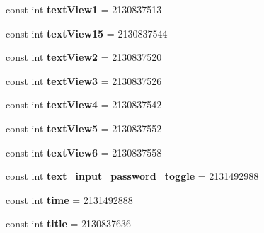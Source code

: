 \begin{DoxyCompactItemize}
const int {\bfseries text\+View1} = 2130837513
\item 
\mbox{\label{classst_delivery_1_1_resource_1_1_id_aae94328cea67c0ba1462637fed0d65a0}} 
const int {\bfseries text\+View15} = 2130837544
\item 
\mbox{\label{classst_delivery_1_1_resource_1_1_id_af31da1de1242db1f03e7ebe3fdaa626b}} 
const int {\bfseries text\+View2} = 2130837520
\item 
\mbox{\label{classst_delivery_1_1_resource_1_1_id_a49a7421005eb32f84debcf2cdf1a9fb5}} 
const int {\bfseries text\+View3} = 2130837526
\item 
\mbox{\label{classst_delivery_1_1_resource_1_1_id_a4d3e775c5281c437af86636d642d1c32}} 
const int {\bfseries text\+View4} = 2130837542
\item 
\mbox{\label{classst_delivery_1_1_resource_1_1_id_a0e6066e14487b6392459ec008b04a618}} 
const int {\bfseries text\+View5} = 2130837552
\item 
\mbox{\label{classst_delivery_1_1_resource_1_1_id_ad16071f260df3ec08bf243eac1a979b0}} 
const int {\bfseries text\+View6} = 2130837558
\item 
\mbox{\label{classst_delivery_1_1_resource_1_1_id_a2beecde9e6c4ae10b5cac777695416b3}} 
const int {\bfseries text\+\_\+input\+\_\+password\+\_\+toggle} = 2131492988
\item 
\mbox{\label{classst_delivery_1_1_resource_1_1_id_a5fa564e332224358404dfded4299826e}} 
const int {\bfseries time} = 2131492888
\item 
\mbox{\label{classst_delivery_1_1_resource_1_1_id_aebd955ceb02b11d08f234f13166dac5b}} 
const int {\bfseries title} = 2130837636
\item 
\mbox{\label{classst_delivery_1_1_resource_1_1_id_ab93992f12899137e437a9e1132d7c57d}} 

\end{DoxyCompactItemize}
